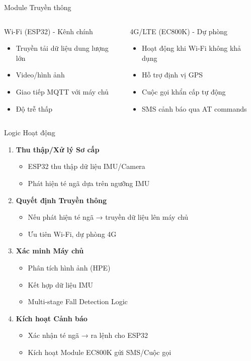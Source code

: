 \begin{frame}{Module Truyền thông}
\begin{columns}
\begin{alertblock}{Wi-Fi (ESP32) - Kênh chính}
\begin{itemize}
\item Truyền tải dữ liệu dung lượng lớn
\item Video/hình ảnh
\item Giao tiếp MQTT với máy chủ
\item Độ trễ thấp
\end{itemize}
\end{alertblock}

\begin{alertblock}{4G/LTE (EC800K) - Dự phòng}
\begin{itemize}
\item Hoạt động khi Wi-Fi không khả dụng
\item Hỗ trợ định vị GPS
\item Cuộc gọi khẩn cấp tự động
\item SMS cảnh báo qua AT commands
\end{itemize}
\end{alertblock}
\end{columns}
\end{frame}

\begin{frame}{Logic Hoạt động}
\begin{enumerate}
\item \textbf{Thu thập/Xử lý Sơ cấp}
\begin{itemize}
\item ESP32 thu thập dữ liệu IMU/Camera
\item Phát hiện té ngã dựa trên ngưỡng IMU
\end{itemize}

\item \textbf{Quyết định Truyền thông}
\begin{itemize}
\item Nếu phát hiện té ngã → truyền dữ liệu lên máy chủ
\item Ưu tiên Wi-Fi, dự phòng 4G
\end{itemize}

\item \textbf{Xác minh Máy chủ}
\begin{itemize}
\item Phân tích hình ảnh (HPE)
\item Kết hợp dữ liệu IMU
\item Multi-stage Fall Detection Logic
\end{itemize}

\item \textbf{Kích hoạt Cảnh báo}
\begin{itemize}
\item Xác nhận té ngã → ra lệnh cho ESP32
\item Kích hoạt Module EC800K gửi SMS/Cuộc gọi
\end{itemize}
\end{enumerate}
\end{frame}

